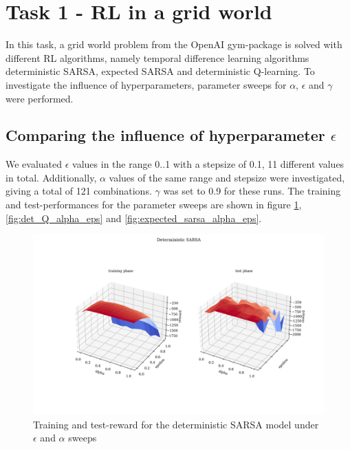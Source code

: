 
\section{Task 1 - RL in a grid world}
In this task, a grid world problem from the OpenAI gym-package is solved with different RL algorithms, namely temporal difference learning algorithms deterministic SARSA, expected SARSA and deterministic Q-learning. To investigate the influence of hyperparameters, parameter sweeps for $\alpha$, $\epsilon$ and $\gamma$ were performed.


\subsection{Comparing the influence of hyperparameter $\epsilon$}
We evaluated $\epsilon$ values in the range 0..1 with a stepsize of 0.1, 11 different values in total. Additionally, $\alpha$ values of the same range and stepsize were investigated, giving a total of 121 combinations. $\gamma$ was set to 0.9 for these runs. The training and test-performances for the parameter sweeps are shown in figure \ref{fig:det_sarsa_alpha_eps}, \ref{fig:det_Q_alpha_eps} and \ref{fig:expected_sarsa_alpha_eps}.


\begin{figure}[H]
    \centering
    \includegraphics[width=1\linewidth]{../plots/det_sarsa_alpha_eps.png}  
    \caption{Training and test-reward for the deterministic SARSA model under $\epsilon$ and $\alpha$ sweeps}
    \label{fig:det_sarsa_alpha_eps}
\end{figure}




